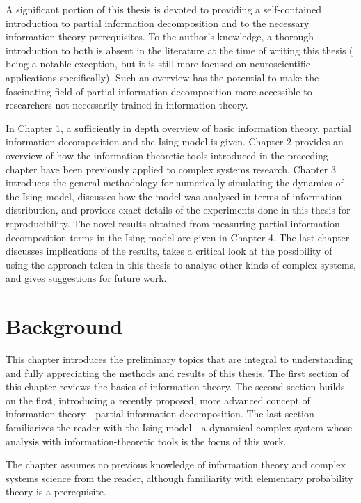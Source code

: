 \documentclass[12pt]{article}
\begin{document}
A significant portion of this thesis is devoted to providing a self-contained introduction to partial information decomposition and to the necessary information theory prerequisites. To the author's knowledge, a thorough introduction to both is absent in the literature at the time of writing this thesis (\cite{bits-from-brains} being a notable exception, but it is still more focused on neuroscientific applications specifically). Such an overview has the potential to make the fascinating field of partial information decomposition more accessible to researchers not necessarily trained in information theory.  

In Chapter 1, a sufficiently in depth overview of basic information theory, partial information decomposition and the Ising model is given. Chapter 2 provides an overview of how the information-theoretic tools introduced in the preceding chapter have been previously applied to complex systems research. Chapter 3 introduces the general methodology for numerically simulating the dynamics of the Ising model, discusses how the model was analysed in terms of information distribution, and provides exact details of the experiments done in this thesis for reproducibility. The novel results obtained from measuring partial information decomposition terms in the Ising model are given in Chapter 4. The last chapter  discusses implications of the results, takes a critical look at the possibility of using the approach taken in this thesis to analyse other kinds of complex systems, and gives suggestions for future work.  

\newpage

\section{Background}

This chapter introduces the preliminary topics that are integral to understanding and fully appreciating the methods and results of this thesis. The first section of this chapter reviews the basics of information theory. The second section builds on the first, introducing a recently proposed, more advanced concept of information theory - partial information decomposition. The last section familiarizes the reader with the Ising model - a dynamical complex system whose analysis with information-theoretic tools is the focus of this work. 

The chapter assumes no previous knowledge of information theory and complex systems science from the reader, although familiarity with elementary probability theory is a prerequisite. 
\end{document}
